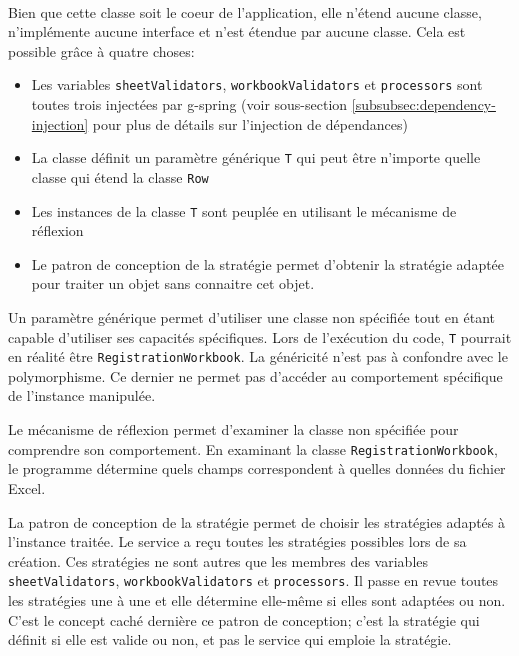 \paragraph{}
Bien que cette classe soit le coeur de l'application, elle n'étend aucune classe, n'implémente aucune interface et n'est étendue par aucune classe.
Cela est possible grâce à quatre choses:
\begin{itemize}
    \item Les variables \lstinline{sheetValidators}, \lstinline{workbookValidators} et \lstinline{processors} sont toutes trois injectées par \Gls{g-spring} (voir sous-section \ref{subsubsec:dependency-injection} pour plus de détails sur l'injection de dépendances)
    \item La classe définit un paramètre générique \lstinline{T} qui peut être n'importe quelle classe qui étend la classe \lstinline{Row}
    \item Les instances de la classe \lstinline{T} sont peuplée en utilisant le mécanisme de réflexion\fnmark{}
    \item Le patron de conception de la stratégie permet d'obtenir la stratégie adaptée pour traiter un objet sans connaitre cet objet.
\end{itemize}

Un paramètre générique permet d'utiliser une classe non spécifiée tout en étant capable d'utiliser ses capacités spécifiques.
Lors de l'exécution du code, \lstinline{T} pourrait en réalité être \lstinline{RegistrationWorkbook}.
La généricité n'est pas à confondre avec le polymorphisme\fnmark{}.
Ce dernier ne permet pas d'accéder au comportement spécifique de l'instance manipulée.

Le mécanisme de réflexion permet d'examiner la classe non spécifiée pour comprendre son comportement.
En examinant la classe \lstinline{RegistrationWorkbook}, le programme détermine quels champs correspondent à quelles données du fichier Excel.

La patron de conception de la stratégie permet de choisir les stratégies adaptés à l'instance traitée.
Le service a reçu toutes les stratégies possibles lors de sa création.
Ces stratégies ne sont autres que les membres des variables \lstinline{sheetValidators}, \lstinline{workbookValidators} et \lstinline{processors}.
Il passe en revue toutes les stratégies une à une et elle détermine elle-même si elles sont adaptées ou non.
C'est le concept caché dernière ce patron de conception; c'est la stratégie qui définit si elle est valide ou non, et pas le service qui emploie la stratégie.

